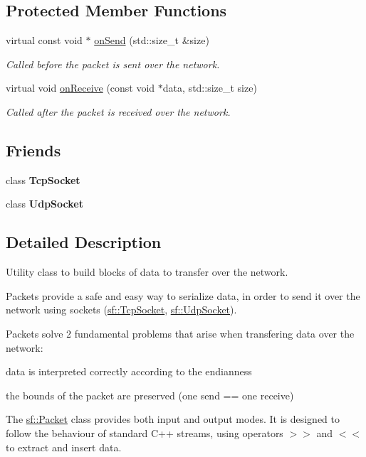 \subsection*{Protected Member Functions}
\begin{DoxyCompactItemize}
\item 
virtual const void $\ast$ \hyperlink{classsf_1_1_packet_a052e955906c9bfd671622cb625380edc}{on\+Send} (std\+::size\+\_\+t \&size)
\begin{DoxyCompactList}\small\item\em Called before the packet is sent over the network. \end{DoxyCompactList}\item 
virtual void \hyperlink{classsf_1_1_packet_ab71a31ef0f1d5d856de6f9fc75434128}{on\+Receive} (const void $\ast$data, std\+::size\+\_\+t size)
\begin{DoxyCompactList}\small\item\em Called after the packet is received over the network. \end{DoxyCompactList}\end{DoxyCompactItemize}
\subsection*{Friends}
\begin{DoxyCompactItemize}
\item 
\hypertarget{classsf_1_1_packet_aa8b32310b01d4bb702d6bcb969d5f130}{class {\bfseries Tcp\+Socket}}\label{classsf_1_1_packet_aa8b32310b01d4bb702d6bcb969d5f130}

\item 
\hypertarget{classsf_1_1_packet_ae128c6687ced82c6157c5f865f8dec5c}{class {\bfseries Udp\+Socket}}\label{classsf_1_1_packet_ae128c6687ced82c6157c5f865f8dec5c}

\end{DoxyCompactItemize}


\subsection{Detailed Description}
Utility class to build blocks of data to transfer over the network. 

Packets provide a safe and easy way to serialize data, in order to send it over the network using sockets (\hyperlink{classsf_1_1_tcp_socket}{sf\+::\+Tcp\+Socket}, \hyperlink{classsf_1_1_udp_socket}{sf\+::\+Udp\+Socket}).

Packets solve 2 fundamental problems that arise when transfering data over the network\+: \begin{DoxyItemize}
\item data is interpreted correctly according to the endianness \item the bounds of the packet are preserved (one send == one receive)\end{DoxyItemize}
The \hyperlink{classsf_1_1_packet}{sf\+::\+Packet} class provides both input and output modes. It is designed to follow the behaviour of standard C++ streams, using operators $>$$>$ and $<$$<$ to extract and insert data.

